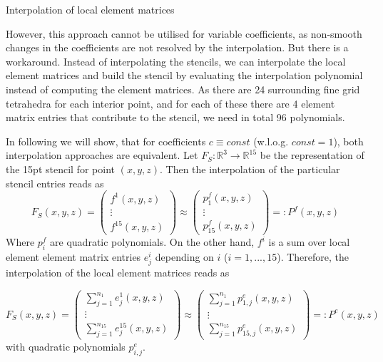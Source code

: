 \documentclass[a4paper,11pt,reqno]{amsart}
\numberwithin{figure}{section}
\numberwithin{table}{section}
\numberwithin{figure}{section}
\def\RR{\mathbb{R}}
\begin{document}
\newpage
\begin{section}{Interpolation of local element matrices}
\label{sec:interpolationLocElementMat}

However, this approach cannot be utilised for variable coefficients, as non-smooth
changes in the coefficients are not resolved by the interpolation. But there is a 
workaround. Instead of interpolating the stencils, we can interpolate the local 
element matrices and build the stencil by evaluating the interpolation polynomial
instead of computing the element matrices. As there are 24 surrounding fine grid
tetrahedra for each interior point, and for each of these there are 4 element matrix
entries that contribute to the stencil, we need in total 96 polynomials.

In following we will show, that for coefficients $c\equiv const$ (w.l.o.g. $const = 1$),
both interpolation approaches are equivalent.
Let $F_S : \RR^3 \rightarrow \RR^{15}$ be the representation of the 15pt stencil
for point $(x,y,z)$. Then the interpolation of the particular stencil entries reads
as
\begin{equation}
\label{eq:interpolationStencil}
F_S(x,y,z) = 
\begin{pmatrix}
f^1(x,y,z) \\
\vdots \\
f^{15}(x,y,z)
\end{pmatrix}
\approx
\begin{pmatrix}
p^f_1(x,y,z) \\
\vdots \\
p^f_{15}(x,y,z)
\end{pmatrix}
=: P^f(x,y,z)
\end{equation}
Where $p^f_i$ are quadratic polynomials.
On the other hand, $f^i$ is a sum over local element element matrix entries 
$e_j^i$ depending on $i$ ($i = 1,...,15$). 
Therefore, the interpolation of the local element matrices reads as

\begin{equation}
\label{eq:interpolationLocStiffness}
F_S(x,y,z) = 
\begin{pmatrix}
\sum_{j=1}^{n_1}e_j^1(x,y,z) \\
\vdots \\
\sum_{j=1}^{n_{15}}e_j^{15}(x,y,z) 
\end{pmatrix}
\approx
\begin{pmatrix}
\sum_{j=1}^{n_1}p_{1,j}^e(x,y,z)  \\
\vdots \\
\sum_{j=1}^{n_{15}}p_{15,j}^e(x,y,z) 
\end{pmatrix}
=: P^e(x,y,z)
\end{equation}
with quadratic polynomials $p^e_{i,j}$.


\end{section}
\end{document}
